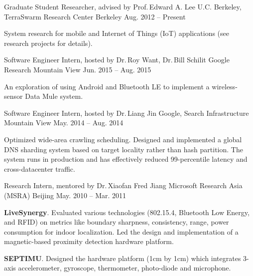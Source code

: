 
\begin{cventries}

  \cventry
  {Graduate Student Researcher, advised by Prof.\,Edward A. Lee}
  {U.C. Berkeley, TerraSwarm Research Center}
  {Berkeley}
  {Aug. 2012 -- Present}
  {
    \begin{cvitems}
      System research for mobile and Internet of Things (IoT) applications (see
      research projects for details).
    \end{cvitems}
  }

  \cventry
  {Software Engineer Intern, hosted by Dr.\,Roy Want, Dr.\,Bill Schilit}
  {Google Research}
  {Mountain View}
  {Jun. 2015 -- Aug. 2015}
  {
    \begin{cvitems}
      An exploration of using Android and Bluetooth LE to implement a
      wireless-sensor Data Mule system.
    \end{cvitems}
  }

  \cventry
  {Software Engineer Intern, hosted by Dr.\,Liang Jin}
  {Google, Search Infrastructure}
  {Mountain View}
  {May. 2014 -- Aug. 2014}
  {
    \begin{cvitems}
      Optimized wide-area crawling scheduling. Designed and implemented a global
      DNS sharding system based on target locality rather than hash
      partition. The system runs in production and has effectively reduced
      99-percentile latency and cross-datacenter traffic.
    \end{cvitems}
  }

  \cventry
  {Research Intern, mentored by Dr.\,Xiaofan Fred Jiang}
  {Microsoft Research Asia (MSRA)}
  {Beijing}
  {May. 2010 -- Mar. 2011}
  {
    \begin{cvitems}
      \item \textbf{LiveSynergy}. Evaluated various technologies (802.15.4, Bluetooth
      Low Energy, and RFID) on metrics like boundary sharpness, consistency,
      range, power consumption for indoor localization. Led the design and
      implementation of a magnetic-based proximity detection hardware platform.
      \item \textbf{SEPTIMU}. Designed the hardware platform (1cm by 1cm) which
      integrates 3-axis accelerometer, gyroscope, thermometer, photo-diode and
      microphone.
    \end{cvitems}
  }

\end{cventries}


